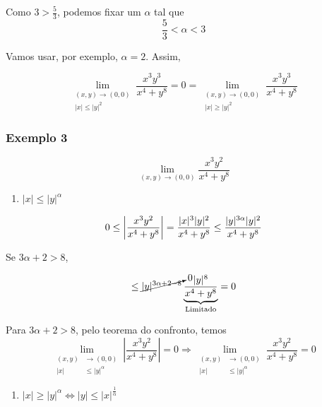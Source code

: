 \documentclass[
  letterpaper,
  DIV=11,
  numbers=noendperiod]{scrreprt}
\providecommand{\tightlist}{%
  \setlength{\itemsep}{0pt}\setlength{\parskip}{0pt}}\usepackage{longtable,booktabs,array}
\begin{document}
Como \(3 > \frac{5}{3}\), podemos fixar um \(\alpha\) tal que \[
\frac{5}{3} < \alpha < 3
\]

Vamos usar, por exemplo, \(\alpha = 2\). Assim,

\[
\lim_{\begin{aligned}(x,y)\rightarrow (0,0)
\\ \lvert x \rvert \leq \lvert y \rvert^{2}
\end{aligned}} \frac{x^3y^3}{x^4+y^8} = 0 = 
\lim_{\begin{aligned}(x,y)\rightarrow (0,0)
\\ \lvert x \rvert \geq \lvert y \rvert^{2}
\end{aligned}} \frac{x^3y^3}{x^4+y^8}
\]

\subsubsection{Exemplo 3}\label{exemplo-3}

\[
\lim_{(x,y)\rightarrow(0,0)} \frac{x^3y^2}{x^4+y^8}
\]

\begin{enumerate}
\def\labelenumi{\arabic{enumi}.}
\tightlist
\item
  \(\lvert x \rvert \leq \lvert y \rvert^{\alpha}\)
\end{enumerate}

\[
0 \leq \left\lvert\frac{x^3 y^2}{x^4+y^8} \right\rvert=
\frac{\lvert x \rvert^3 \lvert y \rvert^2}{x^4+y^8} \leq
\frac{\lvert y \rvert^{3\alpha} \lvert y \rvert^2}{x^4+y^8} \\
\]

Se \(3\alpha + 2 > 8\),

\[
\leq \cancelto{0}{\lvert y \rvert^{3\alpha+2-8}}
\underbrace{\frac{\lvert y \rvert^{8}}{x^4+y^8}}_{\text{Limitado}} = 0
\]

Para \(3\alpha + 2 > 8\), pelo teorema do confronto, temos \[
\lim_{\begin{aligned}(x,y)&\rightarrow (0,0) \\ 
\lvert x \rvert & \leq \lvert y \rvert^{\alpha} \end{aligned}}
\left\lvert \frac{x^3y^2}{x^4+y^8} \right\rvert = 0 \Rightarrow
\lim_{\begin{aligned}(x,y)&\rightarrow (0,0) \\ 
\lvert x \rvert & \leq \lvert y \rvert^{\alpha} \end{aligned}}
\frac{x^3y^2}{x^4+y^8} = 0
\]

\begin{enumerate}
\def\labelenumi{\arabic{enumi}.}
\setcounter{enumi}{1}
\tightlist
\item
  \(\lvert x \rvert \geq \lvert y \rvert^{\alpha} \Leftrightarrow \lvert y \rvert \leq \lvert x \rvert^{\frac{1}{\alpha}}\)
\end{enumerate}
\end{document}

